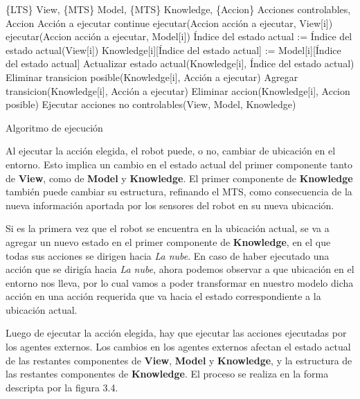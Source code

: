 \begin{algorithm}
\begin{algorithmic}
\REQUIRE \{LTS\} View, \{MTS\} Model, \{MTS\} Knowledge, \{Accion\} Acciones controlables, Accion Acción a ejecutar
\STATE continue
\ENDIF
\STATE ejecutar(Accion acción a ejecutar, View[i])
\STATE ejecutar(Accion acción a ejecutar, Model[i])
\STATE Índice del estado actual := Índice del estado actual(View[i])
\STATE Knowledge[i][Índice del estado actual] := Model[i][Índice del estado actual]
\ENDIF
\STATE Actualizar estado actual(Knowledge[i], Índice del estado actual)
\STATE Eliminar transicion posible(Knowledge[i], Acción a ejecutar)
\STATE Agregar transicion(Knowledge[i], Acción a ejecutar)
\STATE Eliminar accion(Knowledge[i], Accion posible)
\ENDIF
\ENDFOR
\ENDFOR
\STATE Ejecutar acciones no controlables(View, Model, Knowledge)
\end{algorithmic}
\caption{Algoritmo de ejecución}
\end{algorithm}

Al ejecutar la acción elegida, el robot puede, o no, cambiar de ubicación en el entorno. Esto implica un cambio en el estado actual del primer componente tanto 
de \textbf{View}, como de \textbf{Model} y \textbf{Knowledge}. El primer componente de \textbf{Knowledge} también puede cambiar su estructura, refinando el MTS, 
como consecuencia de la nueva información aportada por los sensores del robot en su nueva ubicación.

Si es la primera vez que el robot se encuentra en la ubicación actual, se va a agregar un nuevo estado en el primer componente de \textbf{Knowledge}, en el que todas 
sus acciones se dirigen hacia \textit{La nube}. En caso de haber ejecutado una acción que se dirigía hacia \textit{La nube}, ahora podemos observar a que ubicación 
en el entorno nos lleva, por lo cual vamos a poder transformar en nuestro modelo dicha acción en una acción requerida que va hacia el estado correspondiente 
a la ubicación actual.

Luego de ejecutar la acción elegida, hay que ejecutar las acciones ejecutadas por los agentes externos. Los cambios en los agentes externos afectan el estado actual 
de las restantes componentes de \textbf{View}, \textbf{Model} y \textbf{Knowledge}, y la estructura de las restantes componentes de \textbf{Knowledge}. El proceso se 
realiza en la forma descripta por la figura 3.4.


